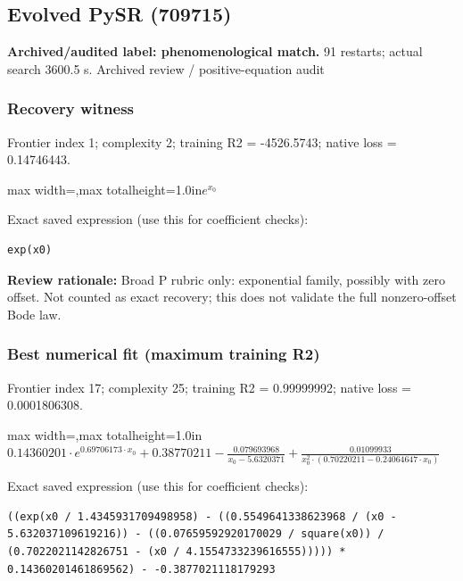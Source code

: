 \documentclass[10pt,letterpaper,landscape]{article}
\begin{document}
\begin{minipage}[t]{0.485\textwidth}
\subsection*{Evolved PySR (709715)}
\textbf{Archived/audited label: phenomenological match.} 91 restarts; actual search 3600.5 s.
{\small Archived review / positive-equation audit}
\subsubsection*{Recovery witness}
Frontier index 1; complexity 2; training R2 = -4526.5743; native loss = 0.14746443.
\begin{center}\begin{adjustbox}{max width=\linewidth,max totalheight=1.0in}$\displaystyle e^{x_{0}}$\end{adjustbox}\end{center}
{\scriptsize Exact saved expression (use this for coefficient checks):}
\begin{lstlisting}
exp(x0)
\end{lstlisting}
{\small\textbf{Review rationale:} Broad P rubric only: exponential family, possibly with zero offset. Not counted as exact recovery; this does not validate the full nonzero-offset Bode law.}
\subsubsection*{Best numerical fit (maximum training R2)}
Frontier index 17; complexity 25; training R2 = 0.99999992; native loss = 0.0001806308.
\begin{center}\begin{adjustbox}{max width=\linewidth,max totalheight=1.0in}$\displaystyle 0.14360201 \cdot e^{0.69706173 \cdot x_{0}} + 0.38770211 - \frac{0.079693968}{x_{0} - 5.6320371} + \frac{0.01099933}{x_{0}^{2} \cdot \left(0.70220211 - 0.24064647 \cdot x_{0}\right)}$\end{adjustbox}\end{center}
{\scriptsize Exact saved expression (use this for coefficient checks):}
\begin{lstlisting}
((exp(x0 / 1.4345931709498958) - ((0.5549641338623968 / (x0 - 5.632037109619216)) - ((0.07659592920170029 / square(x0)) / (0.7022021142826751 - (x0 / 4.1554733239616555))))) * 0.14360201461869562) - -0.3877021118179293
\end{lstlisting}
\end{minipage}
\clearpage{}\label{bode-10006}
\end{document}
